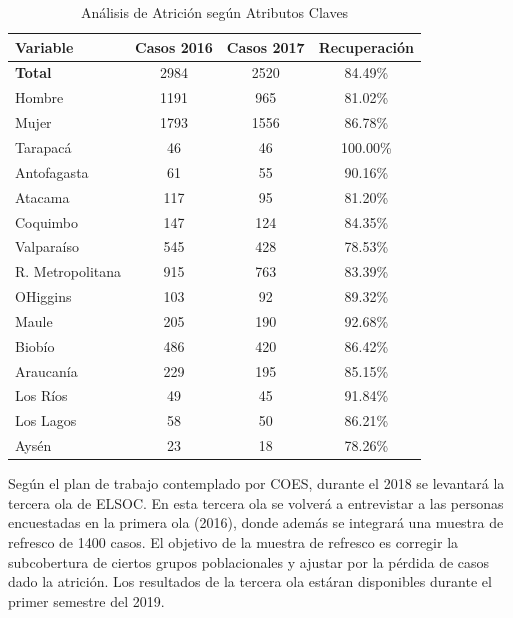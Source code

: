 \documentclass[12pt]{report}
\begin{document}
\begin{table}[H]
	\centering
	\caption{Análisis de Atrición según Atributos Claves}
	\label{table:attrition_02}
	\begin{tabular}{l c c c }
		\toprule
		\textbf{Variable} & \textbf{Casos 2016} &\textbf{Casos 2017}&\textbf{Recuperación}\\
		\midrule
		\textbf{Total} & 2984 & 2520 & 84.49\%\\
		\midrule
		Hombre & 1191 & 965 & 81.02\%\\
		Mujer & 1793 & 1556 & 86.78\%\\
		\midrule
		Tarapacá & 46 & 46 & 100.00\%\\
		Antofagasta & 61 & 55 & 90.16\%\\
		Atacama & 117 & 95 & 81.20\%\\
		Coquimbo & 147 & 124 & 84.35\%\\
		Valparaíso & 545 & 428 & 78.53\%\\
		R. Metropolitana & 915 & 763 & 83.39\%\\
		OHiggins & 103 & 92 & 89.32\%\\
		Maule & 205 & 190 & 92.68\%\\
		Biobío & 486 & 420 & 86.42\%\\
		Araucanía & 229 & 195 & 85.15\%\\
		Los Ríos & 49 & 45 & 91.84\%\\
		Los Lagos & 58 & 50 & 86.21\%\\
		Aysén & 23 & 18 & 78.26\%\\ 

		\bottomrule
	\end{tabular}
\end{table}


Según el plan de trabajo contemplado por COES, durante el 2018 se levantará la tercera ola de ELSOC. En esta tercera ola se volverá a entrevistar a las personas encuestadas en la primera ola (2016), donde además se integrará una muestra de refresco de 1400 casos. El objetivo de la muestra de refresco es corregir la subcobertura de ciertos grupos poblacionales y ajustar por la pérdida de casos dado la atrición. Los resultados de la tercera ola estáran disponibles durante el primer semestre del 2019. \\
\end{document}
